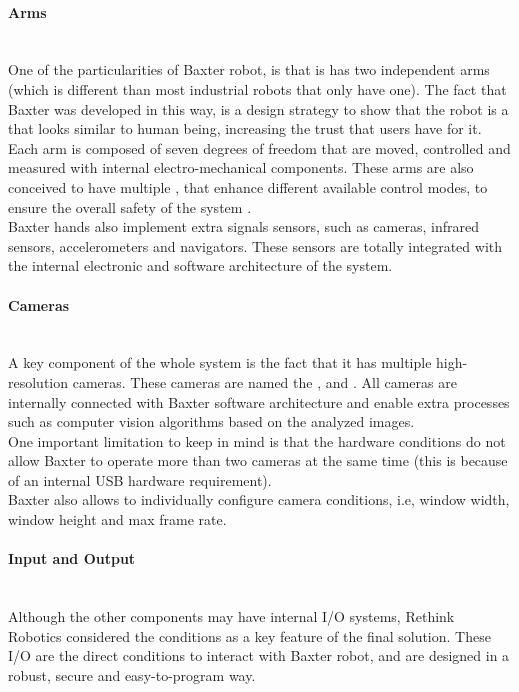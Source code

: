 \documentclass[11pt]{report} %
\newcommand{\subsubsubsection}[1]{\paragraph{#1}\mbox{}\\}
\begin{document}
\subsubsubsection{Arms}

One of the particularities of Baxter robot, is that is has two independent arms (which is different than most industrial robots that only have one). The fact that Baxter was developed in this way, is a design strategy to show that the robot is a  that looks similar to human being, increasing the trust that users have for it.\\

Each arm is composed of seven degrees of freedom that are moved, controlled and measured with internal electro-mechanical components. These arms are also conceived to have multiple , that enhance different available control modes, to ensure the overall safety of the system \citep{cite_baxter_arms_wiki}.\\

Baxter hands also implement extra signals sensors, such as cameras, infrared sensors, accelerometers and navigators. These sensors are totally integrated with the internal electronic and software architecture of the system.\\


\subsubsubsection{Cameras}

A key component of the whole system is the fact that it has multiple high-resolution cameras. These cameras are named the ,  and . All cameras are internally connected with Baxter software architecture and enable extra processes such as computer vision algorithms based on the analyzed images.\\

One important limitation to keep in mind is that the hardware conditions do not allow Baxter to operate more than two cameras at the same time (this is because of an internal USB hardware requirement).\\

Baxter also allows to individually configure camera conditions, i.e, window width, window height and max frame rate.\\


\subsubsubsection{Input and Output}

Although the other components may have internal I/O systems, Rethink Robotics considered the  conditions as a key feature of the final solution. These I/O are the direct conditions to interact with Baxter robot, and are designed in a robust, secure and easy-to-program way.\\
\end{document}
